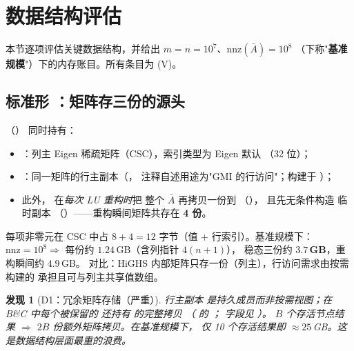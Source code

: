 \documentclass[11pt]{ctexart}
\newtheorem{finding}{发现}
\newcommand{\nnz}{\mathrm{nnz}}
\begin{document}
\section{数据结构评估}
\label{sec:ds}

本节逐项评估关键数据结构，并给出 $m=n=10^{7}$、$\nnz(\bar A)=10^{8}$
（下称"\textbf{基准规模}"）下的内存账目。所有条目为 (V)。

\subsection{标准形 ：矩阵存三份的源头}
（）
同时持有：
\begin{itemize}[leftmargin=2em]
\item {}：列主 Eigen 稀疏矩阵（CSC），索引类型为 Eigen 默认
（32 位）；
\item {}：同一矩阵的行主副本（，
注释自述用途为"GMI 的行访问"；构建于 ）；
\item 此外， 在\emph{每次 LU 重构时}把
整个 $\bar A$ 再拷贝一份到 
（），
且先无条件构造  临时副本
（）——重构瞬间矩阵共存在 \textbf{4 份}。
\end{itemize}
每项非零元在 CSC 中占 $8+4=12$ 字节（值 + 行索引）。基准规模下：
$\nnz=10^{8} \Rightarrow$ 每份约 $1.24\,$GB（含列指针 $4(n{+}1)$），
稳态三份约 $\mathbf{3.7\,\textbf{GB}}$，重构瞬间约 $4.9\,$GB。
对比：HiGHS 内部矩阵只存一份（列主），行访问需求由按需构建的
 承担且可与列主共享值数组。

\begin{finding}[D1：冗余矩阵存储（严重）]
行主副本  是持久成员而非按需视图；在 B\&C 中每个被保留的
 还持有  的完整拷贝
（ 的 ；
 字段见 ）。
$B$ 个存活节点结果 $\Rightarrow$ $2B$ 份额外矩阵拷贝。在基准规模下，
仅 10 个存活结果即 $\approx 25\,$GB。这是数据结构层面最重的浪费。
\end{finding}
\end{document}
